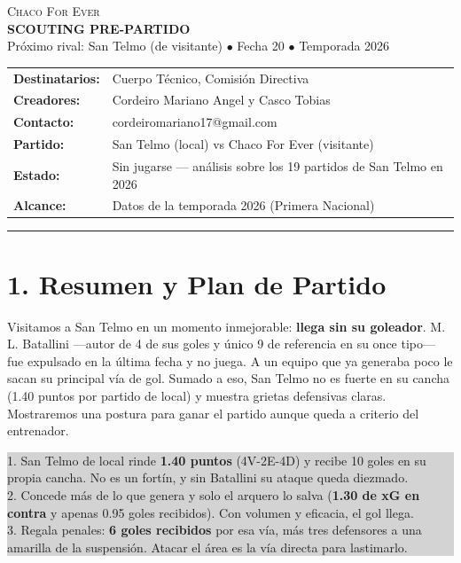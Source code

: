 \documentclass[11pt, a4paper]{article}
\newcommand{\mR}[1]{{\setlength{\fboxsep}{1.5pt}\colorbox{markred}{\textbf{#1}}}}
\newcommand{\alertbox}[2]{%
  \noindent\colorbox{lightgray}{%
    \parbox{\dimexpr\textwidth-2\fboxsep\relax}{%
      \raggedright\smallskip
      \textbf{\color{alertred}{#1}}\par\smallskip
      \small #2\par\smallskip}}%
  \par\vspace{3mm}}
\begin{document}
\begin{center}
  \colorbox{primary}{%
    \parbox{\dimexpr\textwidth-2\fboxsep\relax}{%
      \vspace{4mm}\centering\color{white}
      \textsc{\Large Chaco For Ever} \\ \vspace{1mm}
      \textbf{\Large SCOUTING PRE-PARTIDO} \\ \vspace{1mm}
      \small Próximo rival: San Telmo (de visitante) $\bullet$ Fecha 20 $\bullet$ Temporada 2026
      \vspace{4mm}}}
\end{center}
\vspace{3mm}

\begin{tabular}{ll}
  \textbf{Destinatarios:} & Cuerpo Técnico, Comisión Directiva \\
  \textbf{Creadores:} & Cordeiro Mariano Angel y Casco Tobias \\
  \textbf{Contacto:} & cordeiromariano17@gmail.com \\
  \textbf{Partido:} & San Telmo (local) vs Chaco For Ever (visitante) \\
  \textbf{Estado:} & Sin jugarse — análisis sobre los 19 partidos de San Telmo en 2026 \\
  \textbf{Alcance:} & Datos de la temporada 2026 (Primera Nacional) \\
\end{tabular}
\vspace{3mm}
\hrule
\vspace{3mm}

\section*{1. Resumen y Plan de Partido}

Visitamos a San Telmo en un momento inmejorable: \mR{llega sin su goleador}. M. L. Batallini —autor de 4 de sus goles y único 9 de referencia en su once tipo— fue expulsado en la última fecha y no juega. A un equipo que ya generaba poco le sacan su principal vía de gol. Sumado a eso, San Telmo no es fuerte en su cancha (1.40 puntos por partido de local) y muestra grietas defensivas claras. Mostraremos una postura para ganar el partido aunque queda a criterio del entrenador.

\alertbox{Las tres claves del partido}{
  1. San Telmo de local rinde \mR{1.40 puntos} (4V-2E-4D) y recibe 10 goles en su propia cancha. No es un fortín, y sin Batallini su ataque queda diezmado. \\[1mm]
  2. Concede más de lo que genera y solo el arquero lo salva (\mR{1.30 de xG en contra} y apenas 0.95 goles recibidos). Con volumen y eficacia, el gol llega. \\[1mm]
  3. Regala penales: \mR{6 goles recibidos} por esa vía, más tres defensores a una amarilla de la suspensión. Atacar el área es la vía directa para lastimarlo.
}
\end{document}
